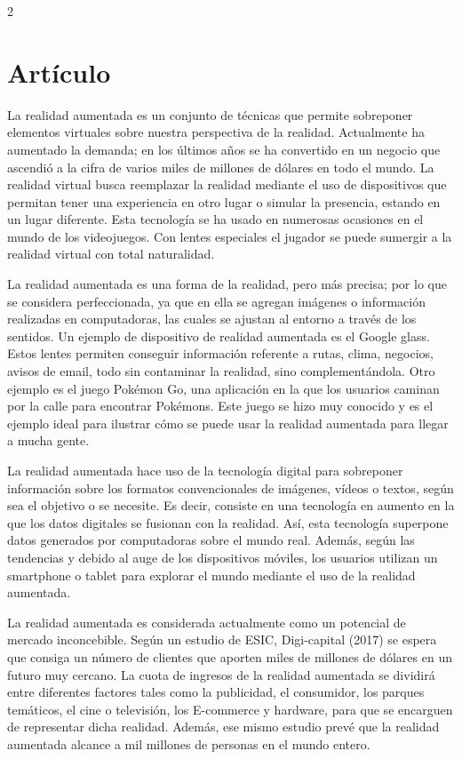 \documentclass[12pt,spanish,Letterpaper,openany]{book}
\begin{document}
\begin {multicols}{2}
\hypertarget{artuxedculo-4}{%
\section{Artículo}\label{artuxedculo-4}}

La realidad aumentada es un conjunto de técnicas que permite sobreponer elementos virtuales sobre nuestra perspectiva de la realidad. Actualmente ha aumentado la demanda; en los últimos años se ha convertido en un negocio que ascendió a la cifra de varios miles de millones de dólares en todo el mundo. La realidad virtual busca reemplazar la realidad mediante el uso de dispositivos que permitan tener una experiencia en otro lugar o simular la presencia, estando en un lugar diferente. Esta tecnología se ha usado en numerosas ocasiones en el mundo de los videojuegos. Con lentes especiales el jugador se puede sumergir a la realidad virtual con total naturalidad.

La realidad aumentada es una forma de la realidad, pero más precisa; por lo que se considera perfeccionada, ya que en ella se agregan imágenes o información realizadas en computadoras, las cuales se ajustan al entorno a través de los sentidos. Un ejemplo de dispositivo de realidad aumentada es el Google glass. Estos lentes permiten conseguir información referente a rutas, clima, negocios, avisos de email, todo sin contaminar la realidad, sino complementándola. Otro ejemplo es el juego Pokémon Go, una aplicación en la que los usuarios caminan por la calle para encontrar Pokémons. Este juego se hizo muy conocido y es el ejemplo ideal para ilustrar cómo se puede usar la realidad aumentada para llegar a mucha gente.

La realidad aumentada hace uso de la tecnología digital para sobreponer información sobre los formatos convencionales de imágenes, vídeos o textos, según sea el objetivo o se necesite. Es decir, consiste en una tecnología en aumento en la que los datos digitales se fusionan con la realidad. Así, esta tecnología superpone datos generados por computadoras sobre el mundo real. Además, según las tendencias y debido al auge de los dispositivos móviles, los usuarios utilizan un smartphone o tablet para explorar el mundo mediante el uso de la realidad aumentada.

La realidad aumentada es considerada actualmente como un potencial de mercado inconcebible. Según un estudio de ESIC, Digi-capital (2017) se espera que consiga un número de clientes que aporten miles de millones de dólares en un futuro muy cercano. La cuota de ingresos de la realidad aumentada se dividirá entre diferentes factores tales como la publicidad, el consumidor, los parques temáticos, el cine o televisión, los E-commerce y hardware, para que se encarguen de representar dicha realidad. Además, ese mismo estudio prevé que la realidad aumentada alcance a mil millones de personas en el mundo entero.


\end{multicols}
\end{document}
